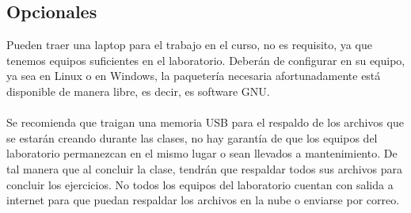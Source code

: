 \documentclass[12pt]{article}
\begin{document}
\subsection{Opcionales}
Pueden traer una laptop para el trabajo en el curso, no es requisito, ya que tenemos equipos suficientes en el laboratorio. Deberán de configurar en su equipo, ya sea en Linux o en Windows, la paquetería necesaria afortunadamente está disponible de manera libre, es decir, es software GNU.
\\
\\
Se recomienda que traigan una memoria USB para el respaldo de los archivos que se estarán creando durante las clases, no hay garantía de que los equipos del laboratorio permanezcan en el mismo lugar o sean llevados a mantenimiento. De tal manera que al concluir la clase, tendrán que respaldar todos sus archivos para concluir los ejercicios. No todos los equipos del laboratorio cuentan con salida a internet para que puedan respaldar los archivos en la nube o enviarse por correo.
\end{document}

